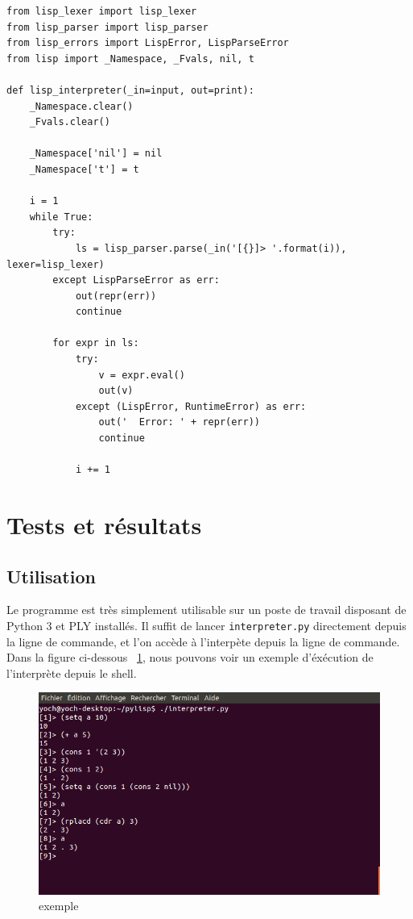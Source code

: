 \documentclass{article}
\begin{document}
\begin{verbatim}
from lisp_lexer import lisp_lexer
from lisp_parser import lisp_parser
from lisp_errors import LispError, LispParseError
from lisp import _Namespace, _Fvals, nil, t
 
def lisp_interpreter(_in=input, out=print):
    _Namespace.clear()
    _Fvals.clear()
 
    _Namespace['nil'] = nil
    _Namespace['t'] = t
    
    i = 1
    while True:
        try:
            ls = lisp_parser.parse(_in('[{}]> '.format(i)), lexer=lisp_lexer)
        except LispParseError as err:
            out(repr(err))
            continue
 
        for expr in ls:
            try:
                v = expr.eval()
                out(v)
            except (LispError, RuntimeError) as err:
                out('  Error: ' + repr(err))
                continue
 
            i += 1
\end{verbatim}

\section{Tests et résultats}

\subsection{Utilisation}
Le programme est très simplement utilisable sur un poste de travail disposant de Python 3 et PLY installés.
Il suffit de lancer \texttt{interpreter.py} directement depuis la ligne de commande, et l'on accède à l'interpète
depuis la ligne de commande.
\\
Dans la figure ci-dessous ~\ref{demo1}, nous pouvons voir un exemple d'éxécution de l'interprète depuis le shell.

\begin{figure}[h]
  \caption{\label{demo1} exemple}
  \includegraphics[width=1.\textwidth]{screen1.png}
\end{figure}
\end{document}
